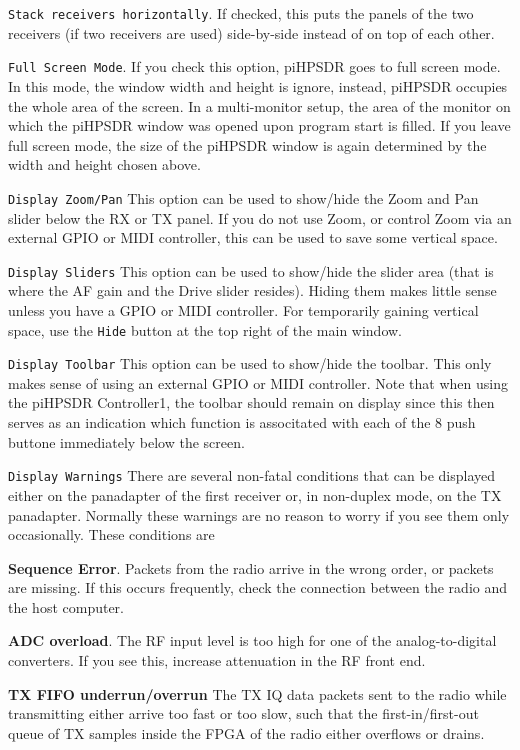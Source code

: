 \documentclass[12pt]{book}
\def\rett#1{\texttt{\color{red}#1}}
\begin{document}
\rett{Stack receivers horizontally}. If checked, this puts the panels
of the two receivers (if two receivers are used) side-by-side instead of on top
of each other.

\rett{Full Screen Mode}. If you check this option, piHPSDR goes to full screen mode.
In this mode, the window width and height is ignore, instead, piHPSDR occupies
the whole area of the screen. In a multi-monitor setup, the area of the monitor
on which the piHPSDR window was opened upon program start is filled.
If you leave full screen mode, the size of the piHPSDR window is again
determined by the width and height chosen above.

 \rett{Display Zoom/Pan} This option can be used to show/hide the Zoom and
 Pan slider below the RX or TX panel. If you do not use Zoom, or control
 Zoom via an external GPIO or MIDI controller, this can be used to save
 some vertical space.

 \rett{Display Sliders} This option can be used to show/hide the slider area
 (that is where the AF gain and the Drive slider resides).
 Hiding them makes little sense unless you
 have a GPIO or MIDI controller. For temporarily gaining vertical space,
 use the \rett{Hide} button at the top right of the main window.

 \rett{Display Toolbar} This option can be used to show/hide the toolbar. This
 only makes sense of using an external GPIO or MIDI controller. Note that
 when using the piHPSDR Controller1, the toolbar should remain on display since
 this then serves as an indication which function is associtated with each of
 the 8 push buttone immediately below the screen.

\rett{Display Warnings} There are several non-fatal conditions that can
be displayed either on the panadapter of the first receiver or, in non-duplex
mode, on the TX panadapter. Normally these warnings are no reason to worry
if you see them  only occasionally. These conditions are

\textbf{Sequence Error}. Packets from the radio arrive in the wrong order, or packets
are missing. If this occurs frequently, check the connection between the radio and
the host computer.

\textbf{ADC overload}. The RF input level is too high for one of the analog-to-digital
converters. If you see this, increase attenuation in the RF front end.

\textbf{TX FIFO underrun/overrun} The TX IQ data packets sent to the radio while transmitting
either arrive too fast or too slow, such that the first-in/first-out queue of TX samples
inside the FPGA of the radio either overflows or drains.
\end{document}
